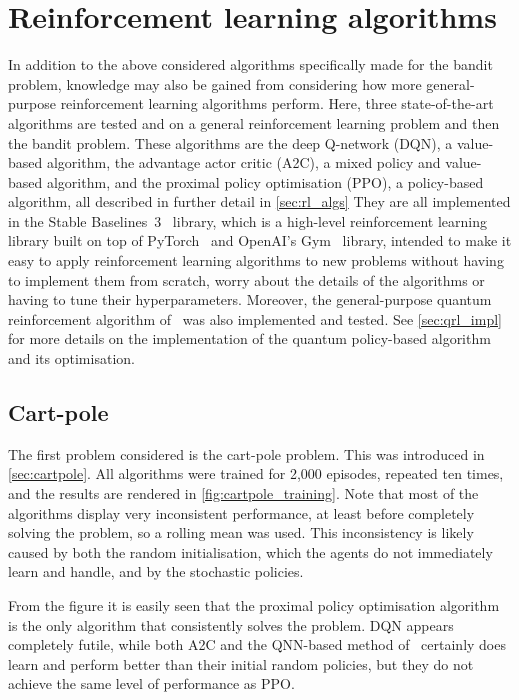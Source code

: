 \section{Reinforcement learning algorithms}
\label{sec:sim_rl}

In addition to the above considered algorithms specifically made for the bandit problem, knowledge may also be gained from considering how more general-purpose reinforcement learning algorithms perform.
Here, three state-of-the-art algorithms are tested and on a general reinforcement learning problem and then the bandit problem.
These algorithms are the deep Q-network (DQN), a value-based algorithm, the advantage actor critic (A2C), a mixed policy and value-based algorithm, and the proximal policy optimisation (PPO), a policy-based algorithm, all described in further detail in \cref{sec:rl_algs}
They are all implemented in the Stable Baselines~3~\autocite{sb3} library, which is a high-level reinforcement learning library built on top of PyTorch~\autocite{pytorch} and OpenAI's Gym~\autocite{gym} library, intended to make it easy to apply reinforcement learning algorithms to new problems without having to implement them from scratch, worry about the details of the algorithms or having to tune their hyperparameters.
Moreover, the general-purpose quantum reinforcement algorithm of~\autocite{jerbi2021} was also implemented and tested.
See \cref{sec:qrl_impl} for more details on the implementation of the quantum policy-based algorithm and its optimisation.

\subsection{Cart-pole}
\label{sec:sim_rl_cartpole}

The first problem considered is the cart-pole problem.
This was introduced in \cref{sec:cartpole}.
All algorithms were trained for 2,000 episodes, repeated ten times, and the results are rendered in \cref{fig:cartpole_training}.
Note that most of the algorithms display very inconsistent performance, at least before completely solving the problem, so a rolling mean was used.
This inconsistency is likely caused by both the random initialisation, which the agents do not immediately learn and handle, and by the stochastic policies.

From the figure it is easily seen that the proximal policy optimisation algorithm is the only algorithm that consistently solves the problem.
DQN appears completely futile, while both A2C and the QNN-based method of~\autocite{jerbi2021} certainly does learn and perform better than their initial random policies, but they do not achieve the same level of performance as PPO.


